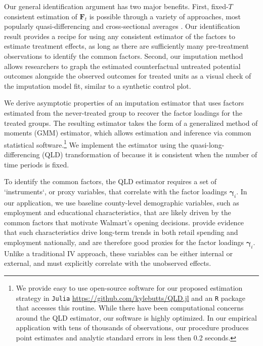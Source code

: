 \documentclass[12pt]{article}
\begin{document}
Our general identification argument has two major benefits. First, fixed-$T$ consistent estimation of $\bm{F}_t$ is possible through a variety of approaches, most popularly quasi-differencing \citep{Ahn_Lee_Schmidt_2001,Ahn_Lee_Schmidt_2013,Callaway_Karami_2020} and cross-sectional averages \citep{Westerlund_Petrova_Norkute_2019,Juodis_Sarafidis_2022,Juodis_Sarafidis2021,Brown_Schmidt_Wooldridge2021}. Our identification result provides a recipe for using any consistent estimator of the factors to estimate treatment effects, as long as there are sufficiently many pre-treatment observations to identify the common factors. Second, our imputation method allows researchers to graph the estimated counterfactual untreated potential outcomes alongside the observed outcomes for treated units as a visual check of the imputation model fit, similar to a synthetic control plot.

We derive asymptotic properties of an imputation estimator that uses factors estimated from the never-treated group to recover the factor loadings for the treated groups. 
The resulting estimator takes the form of a generalized method of moments (GMM) estimator, which allows estimation and inference via common statistical software.\footnote{We provide easy to use open-source software for our proposed estimation strategy in \texttt{Julia} \url{https://github.com/kylebutts/QLD.jl} and an \texttt{R} package that accesses this routine. While there have been computational concerns around the QLD estimator, our software is highly optimized. In our empirical application with tens of thousands of observations, our procedure produces point estimates and analytic standard errors in less then 0.2 seconds.}
We implement the estimator using the quasi-long-differencing (QLD) transformation of \citet{Ahn_Lee_Schmidt_2013} because it is consistent when the number of time periods is fixed. 

To identify the common factors, the QLD estimator requires a set of `instruments`, or proxy variables, that correlate with the factor loadings $\bm \gamma_i$. In our application, we use baseline county-level demographic variables, such as employment and educational characteristics, that are likely driven by the common factors that motivate Walmart's opening decisions. 
\citet{hatch2000job} provide evidence that such characteristics drive long-term trends in both retail spending and employment nationally, and are therefore good proxies for the factor loadings $\bm \gamma_i$. Unlike a traditional IV approach, these variables can be either internal or external, and must explicitly correlate with the unobserved effects. 
\end{document}
